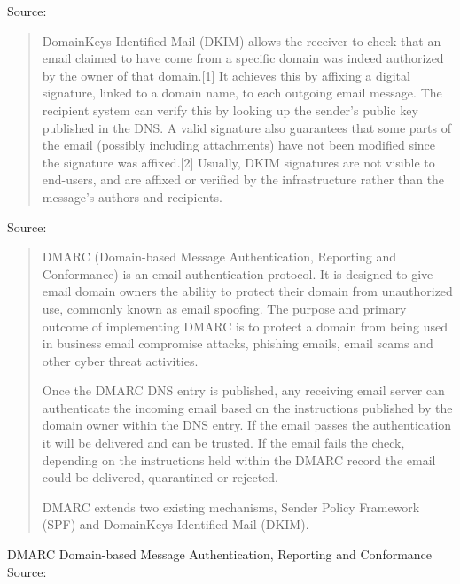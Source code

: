 \documentclass[Screen16to9,17pt]{foils}
\begin{document}
Source:\\{\footnotesize
{}}



\begin{quote}
DomainKeys Identified Mail (DKIM) allows the receiver to check that an email claimed to have come from a specific domain was indeed authorized by the owner of that domain.[1] It achieves this by affixing a digital signature, linked to a domain name, to each outgoing email message. The recipient system can verify this by looking up the sender's public key published in the DNS. A valid signature also guarantees that some parts of the email (possibly including attachments) have not been modified since the signature was affixed.[2] Usually, DKIM signatures are not visible to end-users, and are affixed or verified by the infrastructure rather than the message's authors and recipients.
\end{quote}

Source: \\{\footnotesize
{}}


\begin{quote}\footnotesize
DMARC (Domain-based Message Authentication, Reporting and Conformance) is an email authentication protocol. It is designed to give email domain owners the ability to protect their domain from unauthorized use, commonly known as email spoofing. The purpose and primary outcome of implementing DMARC is to protect a domain from being used in business email compromise attacks, phishing emails, email scams and other cyber threat activities.

Once the DMARC DNS entry is published, any receiving email server can authenticate the incoming email based on the instructions published by the domain owner within the DNS entry. If the email passes the authentication it will be delivered and can be trusted. If the email fails the check, depending on the instructions held within the DMARC record the email could be delivered, quarantined or rejected.

DMARC extends two existing mechanisms, Sender Policy Framework (SPF) and DomainKeys Identified Mail (DKIM).
\end{quote}
DMARC Domain-based Message Authentication, Reporting and Conformance\\
Source: \\{\footnotesize
{}}
\end{document}

